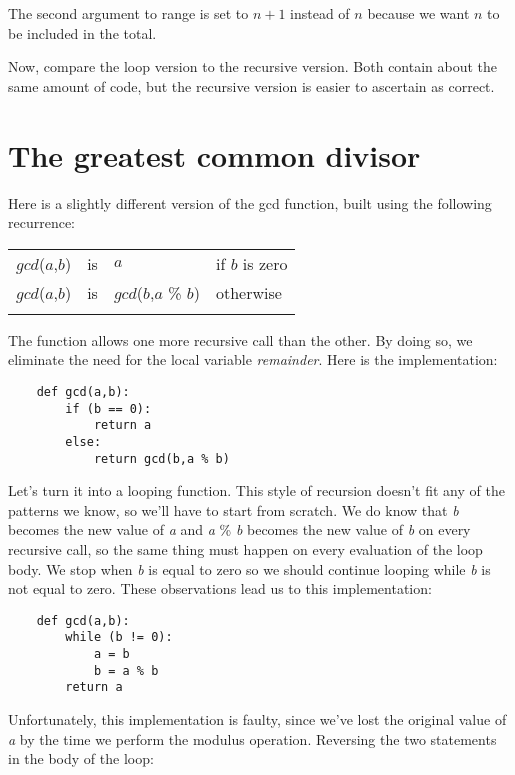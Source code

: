 The second argument to range is set to $n+1$ instead of $n$ because
we want $n$ to be included in the total.

Now, compare the loop version to the recursive version. Both contain
about the same amount of code, but the recursive version is easier
to ascertain as correct.

\section{The greatest common divisor }

Here is a slightly different version of the gcd function, built using
the following recurrence:

\begin{center}
\begin{tabular}{lcll}
\T\toprule
    $gcd$($a$,$b$) & is & $a$ & if $b$ is zero\\
    $gcd$($a$,$b$) & is & $gcd$($b$,$a$ \% $b$) & otherwise \T\\
\T\bottomrule
\end{tabular}
\end{center}

The function allows one more recursive call than the other. By doing
so, we eliminate the need for the local variable {\it remainder}. Here is
the implementation:

\begin{verbatim}
    def gcd(a,b):
        if (b == 0):
            return a
        else:
            return gcd(b,a % b)
\end{verbatim}

Let's turn it into a looping function. This style of
recursion doesn't fit any of the patterns we know, so
we'll have to start from scratch. We do know that 
{\it b} becomes the new value of {\it a} and {\it a} \% {\it b} becomes 
the new value of {\it b}
on every recursive call,
so the same thing must happen on every evaluation of
the loop body.
We stop when {\it b} is equal to zero so we should continue looping
while {\it b} is  not equal to zero. These observations lead us
to this implementation:

\begin{verbatim}
    def gcd(a,b):
        while (b != 0):
            a = b
            b = a % b
        return a
\end{verbatim}

Unfortunately, this implementation is faulty, since we've lost
the original value of {\it a} by the time we perform the modulus 
operation. Reversing the two statements in the body of the loop:

